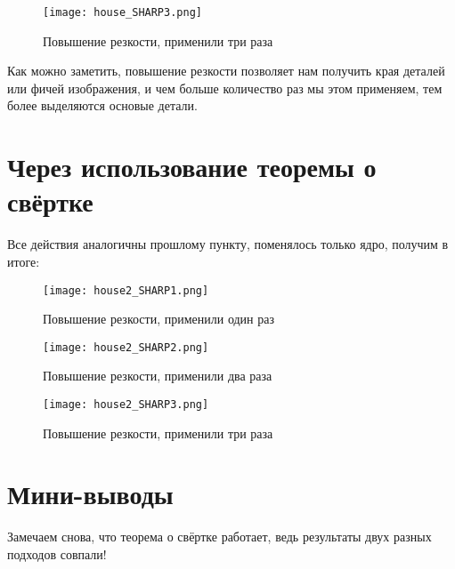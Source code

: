 \begin{figure}[ht]
    \centering
    \texttt{[image: house\_SHARP3.png]}
	\caption{Повышение резкости, применили три раза}
\end{figure}

Как можно заметить, повышение резкости позволяет нам получить края деталей или фичей изображения, и чем больше количество раз мы этом применяем, тем более выделяются основые детали.

\newpage
\section{Через использование теоремы о свёртке}
Все действия аналогичны прошлому пункту, поменялось только ядро, получим в итоге:

\begin{figure}[ht]
    \centering
    \texttt{[image: house2\_SHARP1.png]}
	\caption{Повышение резкости, применили один раз}
\end{figure}



\begin{figure}[ht]
    \centering
    \texttt{[image: house2\_SHARP2.png]}
	\caption{Повышение резкости, применили два раза}
\end{figure}


\begin{figure}[ht]
    \centering
    \texttt{[image: house2\_SHARP3.png]}
	\caption{Повышение резкости, применили три раза}
\end{figure}

\section{Мини-выводы}
Замечаем снова, что теорема о свёртке работает, ведь результаты двух разных подходов совпали!

\endinput